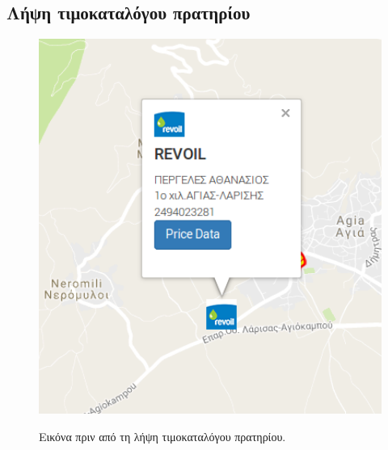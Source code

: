 \subsection{Λήψη τιμοκαταλόγου πρατηρίου}

\begin{figure}[H]
  \caption{Εικόνα πριν από τη λήψη τιμοκαταλόγου πρατηρίου.}
  \centering
    \includegraphics[width=1\textwidth]{img/pricedata1.png}
    \label{fig:pricedata1}
\end{figure}

